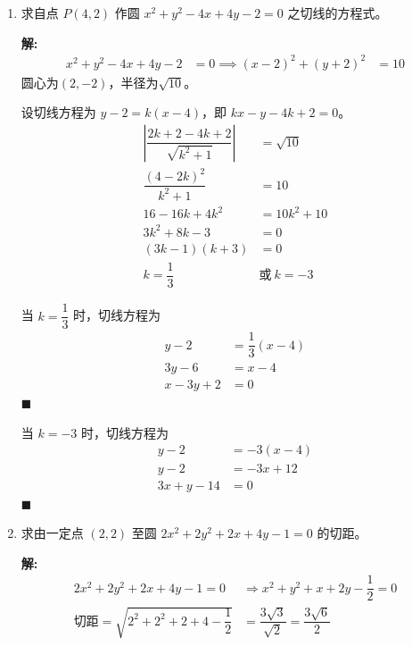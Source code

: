 \documentclass[10pt]{article}
\newcommand{\sol}{\textbf{解:} }
\begin{document}
\begin{enumerate}[leftmargin=*]
  \item 求自点 $P(4,2)$ 作圆 $x^{2}+y^{2}-4 x+4 y-2=0$ 之切线的方程式。

        \sol{}
        \begin{align*}
          x^{2}+y^{2}-4 x+4 y-2 & = 0 \implies (x-2)^{2}+(y+2)^{2} & = 10
        \end{align*}
        圆心为$(2, -2)$，半径为$\sqrt{10}$。

        设切线方程为 $y - 2 = k(x - 4)$，即 $kx - y - 4k + 2 = 0$。
        \begin{align*}
          \left\vert \dfrac{2k + 2 - 4k + 2}{\sqrt{k^{2} + 1}} \right\vert & = \sqrt{10}      \\
          \dfrac{(4 - 2k)^{2}}{k^{2} + 1}                                  & = 10             \\
          16 - 16k + 4k^{2}                                                & = 10k^{2} + 10   \\
          3k^{2} + 8k - 3                                                  & = 0              \\
          (3k - 1)(k + 3)                                                  & = 0              \\
          k = \dfrac{1}{3}                                                 & \text{或}\ k = -3
        \end{align*}

        当 $k = \dfrac{1}{3}$ 时，切线方程为
        \begin{align*}
          y - 2      & = \dfrac{1}{3}(x - 4) \\
          3y - 6     & = x - 4               \\
          x - 3y + 2 & = 0
        \end{align*} \hfill$\blacksquare$

        当 $k = -3$ 时，切线方程为
        \begin{align*}
          y - 2       & = -3(x - 4) \\
          y - 2       & = -3x + 12  \\
          3x + y - 14 & = 0
        \end{align*} \hfill$\blacksquare$

  \item 求由一定点 $(2,2)$ 至圆 $2 x^{2}+2 y^{2}+2 x+4 y-1=0$ 的切距。

        \sol{}
        \begin{align*}
          2x^{2}+2y^{2}+2x+4y-1 = 0                           & \Rightarrow x^{2}+y^{2}+x+2y-\dfrac{1}{2} = 0        \\
          \text{切距} = \sqrt{2^{2}+2^{2}+2 + 4 - \dfrac{1}{2}} & = \dfrac{3\sqrt{3}}{\sqrt{2}} = \dfrac{3\sqrt{6}}{2}
        \end{align*}


\end{enumerate}
\end{document}
